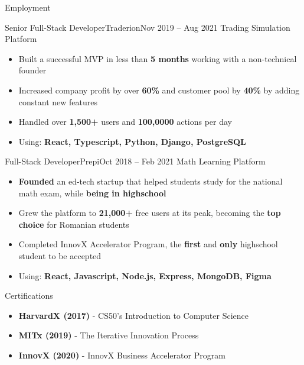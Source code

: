 \documentclass[]{mcdowellcv}
\begin{document}
\begin{cvsection}{Employment}
		\begin{cvsubsection}{Senior Full-Stack Developer}{Traderion}{Nov 2019 -- Aug 2021}
			Trading Simulation Platform
			\begin{itemize}
				\item Built a successful MVP in less than \textbf{5 months} working with a non-technical founder
				\item Increased company profit by over \textbf{60\%} and customer pool by \textbf{40\%} by adding constant new features
				\item Handled over \textbf{1,500+} users and \textbf{100,0000} actions per day
				\item Using: \textbf{React, Typescript, Python, Django, PostgreSQL}
			\end{itemize}
		\end{cvsubsection}
		
		\begin{cvsubsection}{Full-Stack Developer}{Prepi}{Oct 2018 -- Feb 2021}
			Math Learning Platform
			\begin{itemize}
				\item \textbf{Founded} an ed-tech startup that helped students study for the national math exam, while \textbf{being in highschool}
				\item Grew the platform to \textbf{21,000+} free users at its peak, becoming the \textbf{top choice} for Romanian students
				\item Completed InnovX Accelerator Program, the \textbf{first} and \textbf{only} highschool student to be accepted
				\item Using: \textbf{React, Javascript, Node.js, Express, MongoDB, Figma}
			\end{itemize}
		\end{cvsubsection}
	\end{cvsection}
	
	\begin{cvsection}{Certifications}
		\begin{cvsubsection}{}{}{}	
			\begin{itemize}
				\item \textbf{HarvardX (2017)} - CS50's Introduction to Computer Science
				\item \textbf{MITx (2019)} - The Iterative Innovation Process
				\item \textbf{InnovX (2020)} - InnovX Business Accelerator Program
			\end{itemize}
		\end{cvsubsection}
	\end{cvsection}
	
\end{document}
